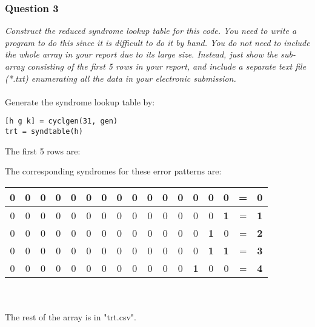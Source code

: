 \documentclass[a4paper]{article}
\begin{document}
\subsubsection*{Question 3} \textit{Construct the reduced syndrome lookup table for this code. You need to write a program to do this since it is difficult to do it by hand. You do not need to include the whole array in your report due to its large size. Instead, just show the sub-array consisting of the first 5 rows in your report, and include a separate text file (*.txt) enumerating all the data in your electronic submission.} \\
\\
Generate the syndrome lookup table by:
\begin{lstlisting}
[h g k] = cyclgen(31, gen)
trt = syndtable(h)
\end{lstlisting}

The first 5 rows are:\\

The corresponding syndromes for these error patterns are:\\
\begin{tabular}{| *{15}{c} | c c |}
\hline
0 & 0 & 0 & 0 & 0 & 0 & 0 & 0 & 0 & 0 & 0 & 0 & 0 & 0 & 0 & = & \textbf{0}  \\
\hline
0 & 0 & 0 & 0 & 0 & 0 & 0 & 0 & 0 & 0 & 0 & 0 & 0 & 0 & \textbf{1} & = & \textbf{1}  \\
\hline
0 & 0 & 0 & 0 & 0 & 0 & 0 & 0 & 0 & 0 & 0 & 0 & 0 & \textbf{1} & 0 & = & \textbf{2}  \\
\hline
0 & 0 & 0 & 0 & 0 & 0 & 0 & 0 & 0 & 0 & 0 & 0 & 0 & \textbf{1} & \textbf{1} & = & \textbf{3}  \\
\hline
0 & 0 & 0 & 0 & 0 & 0 & 0 & 0 & 0 & 0 & 0 & 0 & \textbf{1} & 0 & 0 & = & \textbf{4}  \\
\hline
\end{tabular}\\
\\
The rest of the array is in "trt.csv".
\end{document}
